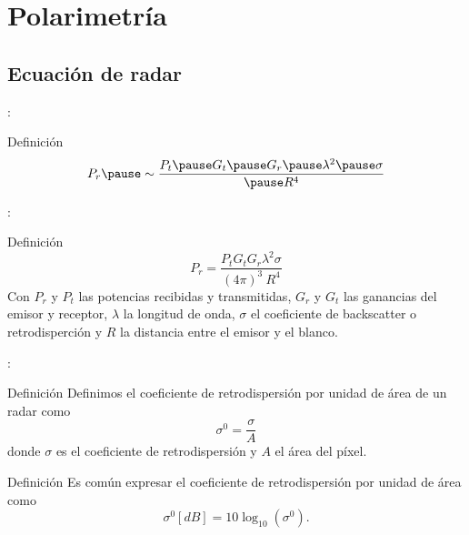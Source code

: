 \section{Polarimetría}

\subsection{Ecuación de radar}

\begin{frame}{\secname : \subsecname}
    \begin{block}{Definición}
      \begin{equation}
        P_r \pause \sim \frac{ P_t \pause G_t \pause G_r \pause \lambda^2 \pause \sigma}{\pause R^4}
      \end{equation}
    \end{block}
\end{frame}

\begin{frame}{\secname : \subsecname}
    \begin{block}{Definición}
      \begin{equation}
        P_r = \frac{ P_t  G_t  G_r  \lambda^2  \sigma}{ (4\pi)^3 \ R^4}
      \end{equation}
      Con $P_r$ y $P_t$ las potencias recibidas y transmitidas, $G_r$ y $G_t$ las ganancias del emisor y receptor, $\lambda$ la longitud de onda, $\sigma$ el coeficiente de backscatter o retrodisperción y $R$ la distancia entre el emisor y el blanco.
    \end{block}
\end{frame}

\begin{frame}{\secname : \subsecname}

  \begin{block}{Definición}
    Definimos el coeficiente de retrodispersión por unidad de área de un radar como
    \begin{equation}
      \sigma^0 = \frac{\sigma}{A}
    \end{equation}
    donde $\sigma$ es el coeficiente de retrodispersión y $A$ el área del píxel.
  \end{block}
  \pause
    \begin{block}{Definición}
      Es común expresar el coeficiente de retrodispersión por unidad de área como
      \begin{equation}
        \sigma^0 [dB] = 10\log_{10}(\sigma^0).
      \end{equation}
    \end{block}
\end{frame}


